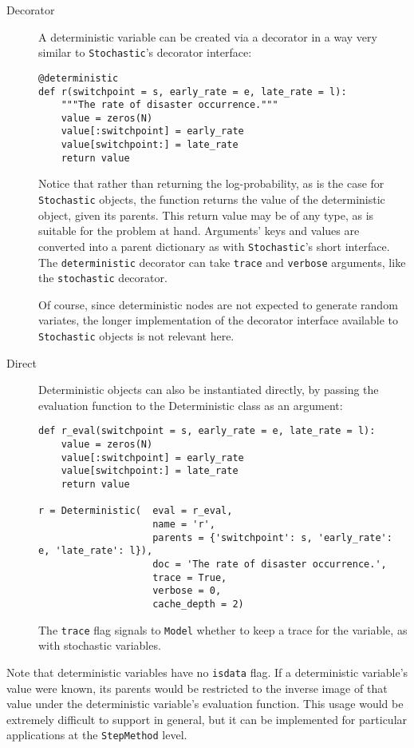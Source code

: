 \begin{description}
    \item[Decorator] A deterministic variable can be created via a decorator in a way very similar to \texttt{Stochastic}'s decorator interface:
\begin{verbatim}
@deterministic
def r(switchpoint = s, early_rate = e, late_rate = l):
    """The rate of disaster occurrence."""
    value = zeros(N)
    value[:switchpoint] = early_rate
    value[switchpoint:] = late_rate
    return value
\end{verbatim}
Notice that rather than returning the log-probability, as is the case for \texttt{Stochastic} objects, the function returns the value of the deterministic object, given its parents. This return value may be of any type, as is suitable for the problem at hand. Arguments' keys and values are converted into a parent dictionary as with \texttt{Stochastic}'s short interface. The \texttt{deterministic} decorator can take \texttt{trace} and \texttt{verbose} arguments, like the \texttt{stochastic} decorator.

Of course, since deterministic nodes are not expected to generate random variates, the longer implementation of the decorator interface available to \texttt{Stochastic} objects is not relevant here.

    \item[Direct] Deterministic objects can also be instantiated directly, by passing the evaluation function to the Deterministic class as an argument:
\begin{verbatim}
def r_eval(switchpoint = s, early_rate = e, late_rate = l):
    value = zeros(N)
    value[:switchpoint] = early_rate
    value[switchpoint:] = late_rate
    return value

r = Deterministic(  eval = r_eval, 
                    name = 'r',
                    parents = {'switchpoint': s, 'early_rate': e, 'late_rate': l}),
                    doc = 'The rate of disaster occurrence.',
                    trace = True,
                    verbose = 0,
                    cache_depth = 2)
\end{verbatim}
The \texttt{trace} flag signals to \texttt{Model} whether to keep a trace for the variable, as with stochastic variables.
\end{description}

Note that deterministic variables have no \texttt{isdata} flag. If a deterministic variable's value were known, its parents would be restricted to the inverse image of that value under the deterministic variable's evaluation function. This usage would be extremely difficult to support in general, but it can be implemented for particular applications at the \texttt{StepMethod} level.

